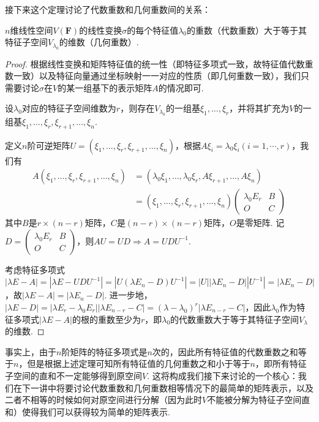 接下来这个定理讨论了代数重数和几何重数间的关系：
\begin{theorem}\label{thm:18:代数重数与几何重数}
    $n$维线性空间$V(\mathbf{F})$的线性变换$\sigma$的每个特征值$\lambda_0$的重数（代数重数）大于等于其特征子空间$V_{\lambda_0}$的维数（几何重数）.
\end{theorem}

\begin{proof}
    根据线性变换和矩阵特征值的统一性（即特征多项式一致，故特征值代数重数一致）以及特征向量通过坐标映射一一对应的性质（即几何重数一致），我们只需要讨论$\sigma$在$V$的某一组基下的表示矩阵$A$的情况即可.

    设$\lambda_0$对应的特征子空间维数为$r$，则存在$V_{\lambda_0}$的一组基$\xi_1,\ldots,\xi_r$，并将其扩充为$V$的一组基$\xi_1,\ldots,\xi_r,\xi_{r+1},\ldots,\xi_n$.

    定义$n$阶可逆矩阵$U=(\xi_1,\ldots,\xi_r,\xi_{r+1},\ldots,\xi_n)$，根据$A\xi_i=\lambda_0\xi_i(i=1,\cdots,r)$，我们有
    \begin{align*}
        A(\xi_1,\ldots,\xi_r,\xi_{r+1},\ldots,\xi_n) & = (\lambda_0\xi_1,\ldots,\lambda_0\xi_r,A\xi_{r+1},\ldots,A\xi_n) \\
                                                     & = (\xi_1,\ldots,\xi_r,\xi_{r+1},\ldots,\xi_n)
        \begin{pmatrix}
            \lambda_0 E_r & B \\ O & C
        \end{pmatrix}
    \end{align*}
    其中$B$是$r\times(n-r)$矩阵，$C$是$(n-r)\times(n-r)$矩阵，$O$是零矩阵. 记$D=\begin{pmatrix}
            \lambda_0 E_r & B \\ O & C
        \end{pmatrix}$，则$AU=UD\Rightarrow A=UDU^{-1}$.

    考虑特征多项式$|\lambda E-A|=|\lambda E-UDU^{-1}|=|U(\lambda E_n-D)U^{-1}|=|U||\lambda E_n-D||U^{-1}|=|\lambda E_n-D|$，故$|\lambda E-A|=|\lambda E_n-D|$. 进一步地，$|\lambda E-D|=|\lambda E_r-\lambda_0 E_r||\lambda E_{n-r}-C|=(\lambda-\lambda_0)^r|\lambda E_{n-r}-C|$，因此$\lambda_0$作为特征多项式$|\lambda E-A|$的根的重数至少为$r$，即$\lambda_0$的代数重数大于等于其特征子空间$V_{\lambda}$的维数.
\end{proof}

事实上，由于$n$阶矩阵的特征多项式是$n$次的，因此所有特征值的代数重数之和等于$n$，但是根据上述定理可知所有特征值的几何重数之和小于等于$n$，即所有特征子空间的直和不一定能够得到原空间$V$. 这将构成我们接下来讨论的一个核心：我们在下一讲中将要讨论代数重数和几何重数相等情况下的最简单的矩阵表示，以及二者不相等的时候如何对原空间进行分解（因为此时$V$不能被分解为特征子空间直和）使得我们可以获得较为简单的矩阵表示.

